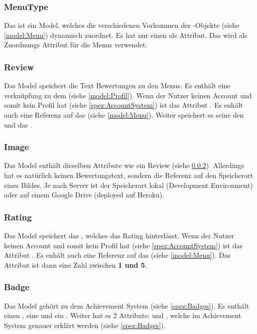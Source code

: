 \subsubsection{MenuType}\label{model:MenuType} Das  ist ein
Model, welches die verschiedenen Vorkommen der -Objekte (siehe
\ref{model:Menu}) dynamisch zuordnet. Es hat nur einen  als Attribut. Das
wird als Zuordnungs Attribut für die Menus verwendet.

\subsubsection{Review}\label{model:Review} Das  Model speichert die
Text Bewertungen zu den Menus. Es enthält eine verknüpfung zu dem 
(siehe \ref{model:Profil}). Wenn der Nutzer keinen Account und somit kein Profil
hat (siehe \ref{spez:AccountSystem}) ist das Attribut . Es enhält
auch eine Referenz auf das  (siehe \ref{model:Menu}). Weiter
speichert es seine  den  und das .

\subsubsection{Image}\label{model:Image} Das  Model enthält
dieselben Attribute wie ein Review (siehe \ref{model:Review}). Allerdings hat es
natürlich keinen Bewertungstext, sondern die Referenz auf den Speicherort eines
Bildes. Je nach Server ist der Speicherort lokal (Development Environment) oder
auf einem Google Drive (deployed auf Heroku).

\subsubsection{Rating}\label{model:Rating} Das  Model speichert das
, welches das Rating hinterlässt. Wenn der Nutzer keinen Account
und somit kein Profil hat (siehe \ref{spez:AccountSystem}) ist das Attribut
. Es enhält auch eine Referenz auf das  (siehe
\ref{model:Menu}). Das Attribut  ist dann eine Zahl zwischen
\textbf{1 und 5}.

\subsubsection{Badge}\label{model:Badge} Das  Model gehört zu dem
Achievement System (siehe \ref{spez:Badges}). Es enthält einen ,
eine  und ein . Weiter hat es 2 Attribute:
 und , welche im Achievement System genauer
erklärt werden (siehe \ref{spez:Badges}).

